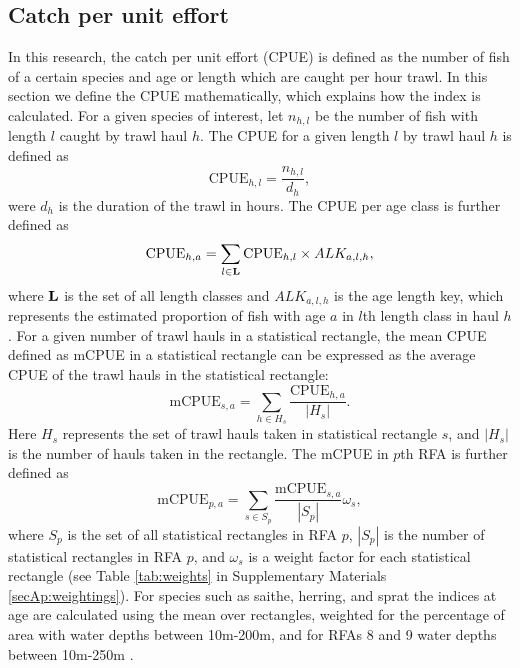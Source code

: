\documentclass[a4paper 12pt]{article}
\numberwithin{equation}{section}
\begin{document}
\subsection{Catch per unit effort}
\label{sec:cpueestimators}
In this research, the catch per unit effort (CPUE) is defined as the number of fish of a certain species and age or length which are caught per hour trawl. In this section we define the CPUE mathematically, which explains how the index is calculated. For a given species of interest, let $n_{h,l}$ be the number of fish with length $l$ caught by trawl haul $h$. The CPUE for a given length $l$ by trawl haul $h$ is defined as 
\begin{equation}\label{eq:cpueHaul}
\mathrm{CPUE}_{h,l} =\frac{n_{h,l}}{d_h},
\end{equation}
were $d_h$ is the duration of the trawl in hours. The CPUE per age class is further defined as
\begin{equation}\label{eq:cpueALK}
\mathrm{CPUE}_{h,a} =\sum_{l \in {\bf L}}\mathrm{CPUE}_{h, l} \times ALK_{a,l,h},
\end{equation}
where ${\bf L}$ is the set of all length classes and $ALK_{a,l,h}$ is the age length key, which represents the estimated proportion of fish with age $a$ in $l$th length class in haul $h$. For a given number of trawl hauls in a statistical rectangle, the mean CPUE defined as  mCPUE  in a statistical rectangle can be expressed as the average CPUE of the trawl hauls in the statistical rectangle:
\begin{equation}\label{eq:cpueRec}
\mathrm{mCPUE}_{s,a} =\sum_{h \in H_{s}}\frac{\mathrm{CPUE}_{h,a}}{|H_{s}|}.
\end{equation}
Here $H_{s}$ represents the set of trawl hauls taken in statistical rectangle $s$, and $|H_{s}|$ is the number of hauls taken in the rectangle. The mCPUE in $p$th RFA is further defined as
\begin{equation}\label{eq:cpueRFA}
\mathrm{mCPUE}_{p,a} = \sum_{s \in S_{p}} \frac{\mathrm{mCPUE}_{s,a}}{|S_{p}|} \omega_s,
\end{equation}
where $S_{p}$ is the set of all statistical rectangles in RFA $p$, $|S_{p}|$ is the number of statistical rectangles in RFA $p$, and $\omega_s$ is a weight factor for each statistical rectangle (see Table \ref{tab:weights} in Supplementary Materials \ref{secAp:weightings}). For species such as saithe, herring, and sprat the indices at age are calculated using the mean over rectangles, weighted for the percentage of area with water depths between 10m-200m, and for RFAs 8 and 9 water depths between 10m-250m \citep{ICES2013}.
\end{document}
